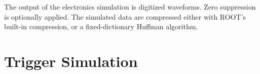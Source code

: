 The output of the electronics simulation is digitized waveforms.  Zero suppression is optionally
applied.  The simulated data are compressed either with ROOT's built-in compression, or a fixed-dictionary
Huffman algorithm.

\section{Trigger Simulation}
